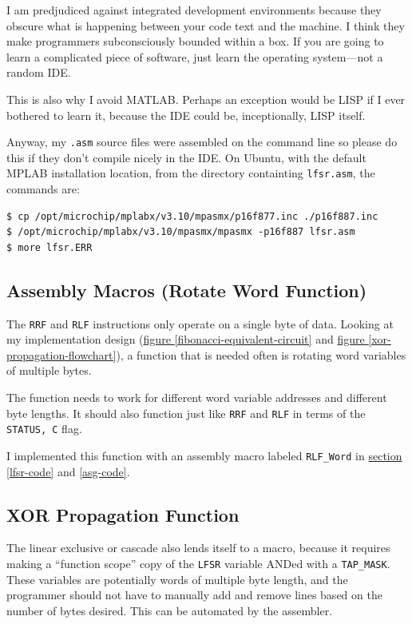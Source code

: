 \documentclass[11pt]{article}
\begin{document}
I am predjudiced against integrated development environments because
they obscure what is happening between your code text and the machine.
I think they make programmers subconsciously bounded within a box.
If you are going to learn a complicated piece of software, just learn
the operating system---not a random IDE.

This is also why I avoid MATLAB. Perhaps an exception would be LISP if
I ever bothered to learn it, because the IDE could be, inceptionally, LISP itself.

Anyway, my \texttt{.asm} source files were assembled on the command line so
please do this if they don't compile nicely in the IDE.
On Ubuntu, with the default MPLAB installation location, 
from the directory containting \texttt{lfsr.asm}, the commands are:
\begin{verbatim}
$ cp /opt/microchip/mplabx/v3.10/mpasmx/p16f877.inc ./p16f887.inc
$ /opt/microchip/mplabx/v3.10/mpasmx/mpasmx -p16f887 lfsr.asm
$ more lfsr.ERR
\end{verbatim}

\subsection{Assembly Macros (Rotate Word Function)}

The \texttt{RRF} and \texttt{RLF} instructions only operate on a single
byte of data. Looking at my implementation design
(\hyperref[fibonacci-equivalent-circuit]{figure \ref{fibonacci-equivalent-circuit}} and
\hyperref[xor-propagation-flowchart]{figure \ref{xor-propagation-flowchart}}),
a function that is needed often is rotating word variables of multiple bytes.

The function needs to work for different word variable addresses and different byte lengths.
It should also function just like \texttt{RRF} and \texttt{RLF} in terms of the
\texttt{STATUS, C} flag.

I implemented this function with an assembly macro labeled \texttt{RLF\_Word}
in \hyperref[lfsr-code]{section \ref{lfsr-code}} and \ref{asg-code}.

\subsection{XOR Propagation Function}

The linear exclusive or cascade also lends itself to a macro, because
it requires making a ``function scope'' copy of the \texttt{LFSR} variable
ANDed with a \texttt{TAP\_MASK}. These variables are potentially words of
multiple byte length, and the programmer should not have to manually add
and remove lines based on the number of bytes desired. This can be automated
by the assembler.
\end{document}
